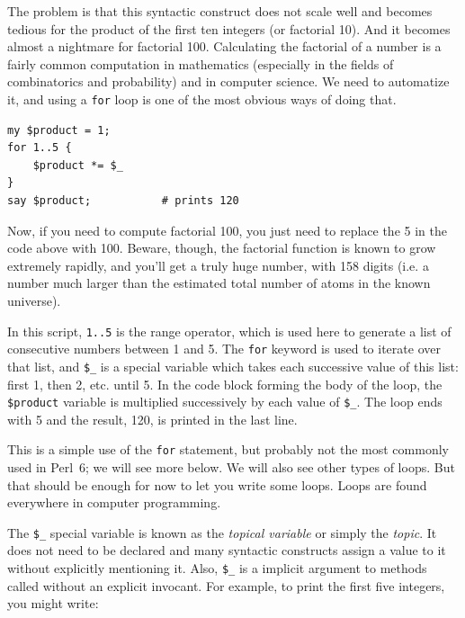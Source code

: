 The problem is that this syntactic construct does 
not scale well and becomes tedious for the product of the first 
ten integers (or factorial 10). And it becomes almost a 
nightmare for factorial 100. 
Calculating the factorial of a number is a fairly common computation 
in mathematics (especially in the fields of combinatorics 
and probability) and in computer science. We need to 
automatize it, and using a {\tt for} 
loop is one of the most obvious ways of doing that.

\begin{verbatim}
my $product = 1;
for 1..5 {
    $product *= $_
}
say $product;           # prints 120
\end{verbatim}

Now, if you need to compute factorial 100, you just need to 
replace the 5 in the code above with 100. Beware, though, 
the factorial function is known to grow extremely rapidly, 
and you'll get a truly huge number, with 158 digits 
(i.e. a number much larger than the estimated total 
number of atoms in the known universe).

In this script, {\tt 1..5} is the range operator, which is used here 
to generate a list of consecutive numbers between 1 and 5. The 
{\tt for} keyword is used to iterate over that list, and  
\verb"$_" is a special variable which takes each successive 
value of this list: first 1, then 2, etc. until 5. In the code 
block forming the body of the loop, the {\tt \$product} variable 
is multiplied successively by each value of \verb"$_". The loop 
ends with 5 and the result, 120, is printed in the last line.

This is a simple use of the {\tt for} statement, 
but probably not the most commonly used in Perl~6; 
we will see more below. We will also see other types of loops. 
But that should be enough for now to let you write some loops. Loops 
are found everywhere in computer programming.

The \verb"$_" special variable is known as the \emph{topical 
variable} or simply the \emph{topic}. It does not need to be declared 
and many syntactic constructs assign a value to it without 
explicitly mentioning it. Also, \verb"$_" is a implicit argument 
to methods called without an explicit invocant. For example, 
to print the first five integers, you might write:

